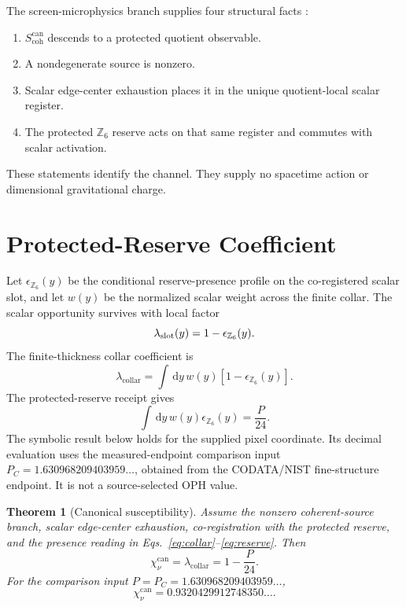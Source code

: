 \documentclass[11pt]{article}
\numberwithin{equation}{section}
\newtheorem{theorem}{Theorem}[section]
\theoremstyle{remark}
\newcommand{\chican}{\chi_\nu^{\mathrm{can}}}
\newcommand{\scohcan}{S_{\mathrm{coh}}^{\mathrm{can}}}
\newcommand{\lambdac}{\lambda_{\mathrm{collar}}}
\newcommand{\dd}{\,\mathrm d}
\begin{document}
The screen-microphysics branch supplies four structural facts
\cite{oph-micro}:
\begin{enumerate}[label=S\arabic*.,leftmargin=*]
\item \(\scohcan\) descends to a protected quotient observable.
\item A nondegenerate source is nonzero.
\item Scalar edge-center exhaustion places it in the unique quotient-local
scalar register.
\item The protected \(\mathbb Z_6\) reserve acts on that same register and
commutes with scalar activation.
\end{enumerate}
These statements identify the channel. They supply no spacetime action or
dimensional gravitational charge.

\section{Protected-Reserve Coefficient}

Let \(\epsilon_{\mathbb Z_6}(y)\) be the conditional reserve-presence profile
on the co-registered scalar slot, and let \(w(y)\) be the normalized scalar
weight across the finite collar. The scalar opportunity survives with local
factor
\begin{equation}
\lambda_{\rm slot}(y)=1-\epsilon_{\mathbb Z_6}(y).
\end{equation}
The finite-thickness collar coefficient is
\begin{equation}
\lambdac=\int\dd y\,w(y)
\left[1-\epsilon_{\mathbb Z_6}(y)\right].
\label{eq:collar}
\end{equation}
The protected-reserve receipt gives
\begin{equation}
\int\dd y\,w(y)\epsilon_{\mathbb Z_6}(y)=\frac{P}{24}.
\label{eq:reserve}
\end{equation}
The symbolic result below holds for the supplied pixel coordinate. Its decimal
evaluation uses the measured-endpoint comparison input
\(P_C=1.630968209403959\ldots\), obtained from the CODATA/NIST fine-structure
endpoint. It is not a source-selected OPH value.

\begin{theorem}[Canonical susceptibility]
Assume the nonzero coherent-source branch, scalar edge-center exhaustion,
co-registration with the protected reserve, and the presence reading in
Eqs.~\eqref{eq:collar}--\eqref{eq:reserve}. Then
\begin{equation}
\boxed{\chican=\lambdac=1-\frac{P}{24}}.
\label{eq:canonical}
\end{equation}
For the comparison input \(P=P_C=1.630968209403959\ldots\),
\begin{equation}
\boxed{\chican=0.9320429912748350\ldots}.
\label{eq:value}
\end{equation}
\end{theorem}
\end{document}
